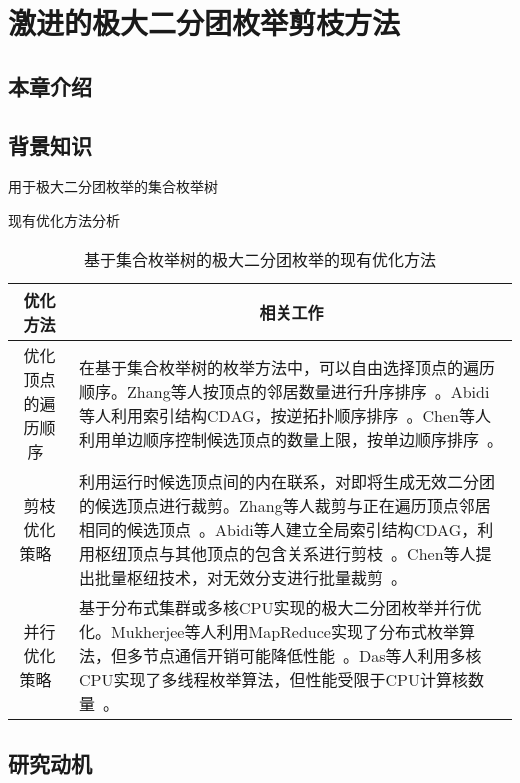 \chapter{激进的极大二分团枚举剪枝方法}
\label{ch:aggressive_mbe}

\section{本章介绍}
\section{背景知识}
用于极大二分团枚举的集合枚举树

现有优化方法分析


\begin{table} 

  \caption{基于集合枚举树的极大二分团枚举的现有优化方法}
  \label{tbl:sota}
  \centering
  
  \begin{tabular}{|c|p{10cm}|}\toprule
    \hline
    \textbf{优化方法} & \multicolumn{1}{c|}{\textbf{相关工作}} \\ \hline
优化顶点的遍历顺序~\cite{iMBEA14,PMBE20,ooMBE22} & 在基于集合枚举树的枚举方法中，可以自由选择顶点的遍历顺序。Zhang等人按顶点的邻居数量进行升序排序~\cite{iMBEA14}。Abidi等人利用索引结构CDAG，按逆拓扑顺序排序~\cite{PMBE20}。Chen等人利用单边顺序控制候选顶点的数量上限，按单边顺序排序~\cite{ooMBE22}。\\ \hline
剪枝优化策略~\cite{iMBEA14,PMBE20,ooMBE22} & 利用运行时候选顶点间的内在联系，对即将生成无效二分团的候选顶点进行裁剪。Zhang等人裁剪与正在遍历顶点邻居相同的候选顶点~\cite{iMBEA14}。Abidi等人建立全局索引结构CDAG，利用枢纽顶点与其他顶点的包含关系进行剪枝~\cite{PMBE20}。Chen等人提出批量枢纽技术，对无效分支进行批量裁剪~\cite{ooMBE22}。\\ \hline
并行优化策略~\cite{mapreduceMBE16,parMBE18} & 基于分布式集群或多核CPU实现的极大二分团枚举并行优化。Mukherjee等人利用MapReduce实现了分布式枚举算法，但多节点通信开销可能降低性能~\cite{mapreduceMBE16}。Das等人利用多核CPU实现了多线程枚举算法，但性能受限于CPU计算核数量~\cite{parMBE18}。 \\ \hline

  \end{tabular}
    
\end{table}


\section{研究动机}

